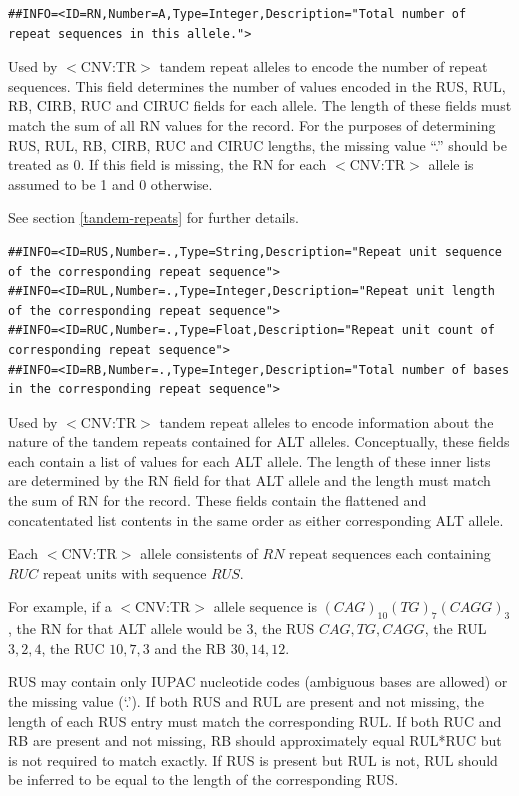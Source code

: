 \documentclass[8pt]{article}
\begin{document}
\footnotesize
\begin{verbatim}
##INFO=<ID=RN,Number=A,Type=Integer,Description="Total number of repeat sequences in this allele.">
\end{verbatim}
\normalsize

Used by $<$CNV:TR$>$ tandem repeat alleles to encode the number of repeat sequences.
This field determines the number of values encoded in the RUS, RUL, RB, CIRB, RUC and CIRUC fields for each allele.
The length of these fields must match the sum of all RN values for the record.
For the purposes of determining RUS, RUL, RB, CIRB, RUC and CIRUC lengths, the missing value ``.'' should be treated as 0.
If this field is missing, the RN for each $<$CNV:TR$>$ allele is assumed to be 1 and 0 otherwise.

See section \ref{tandem-repeats} for further details.

\footnotesize
\begin{verbatim}
##INFO=<ID=RUS,Number=.,Type=String,Description="Repeat unit sequence of the corresponding repeat sequence">
##INFO=<ID=RUL,Number=.,Type=Integer,Description="Repeat unit length of the corresponding repeat sequence">
##INFO=<ID=RUC,Number=.,Type=Float,Description="Repeat unit count of corresponding repeat sequence">
##INFO=<ID=RB,Number=.,Type=Integer,Description="Total number of bases in the corresponding repeat sequence">
\end{verbatim}
\normalsize

Used by $<$CNV:TR$>$ tandem repeat alleles to encode information about the nature of the tandem repeats contained for ALT alleles.
Conceptually, these fields each contain a list of values for each ALT allele.
The length of these inner lists are determined by the RN field for that ALT allele and the length must match the sum of RN for the record.
These fields contain the flattened and concatentated list contents in the same order as either corresponding ALT allele.

Each $<$CNV:TR$>$ allele consistents of $RN$ repeat sequences each containing $RUC$ repeat units with sequence $RUS$.

For example, if a $<$CNV:TR$>$ allele sequence is $(CAG)_{10}(TG)_{7}(CAGG)_{3}$, the RN for that ALT allele would be 3, the RUS $CAG,TG,CAGG$, the RUL $3,2,4$, the RUC $10,7,3$ and the RB $30,14,12$.

RUS may contain only IUPAC nucleotide codes (ambiguous bases are allowed) or the missing value (`.').
If both RUS and RUL are present and not missing, the length of each RUS entry must match the corresponding RUL.
If both RUC and RB are present and not missing, RB should approximately equal RUL*RUC but is not required to match exactly.
If RUS is present but RUL is not, RUL should be inferred to be equal to the length of the corresponding RUS.
\end{document}
